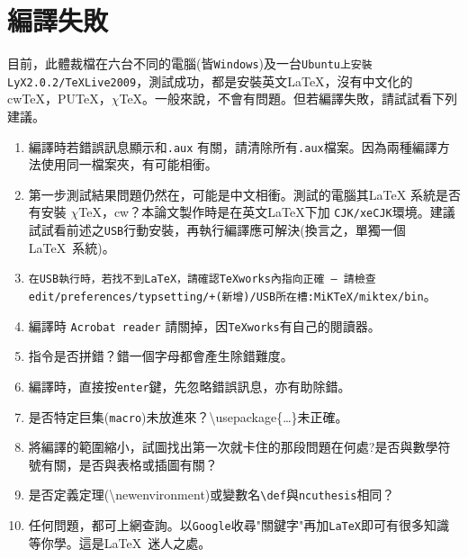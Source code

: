 \section{編譯失敗}
目前，此體裁檔在六台不同的電腦(皆{\tt Windows})及一台{\tt Ubuntu上安裝LyX2.0.2/TeXLive2009}，測試成功，都是安裝英文\LaTeX{}，沒有中文化的cw\TeX，PU\TeX，$\chi$\TeX。一般來說，不會有問題。但若編譯失敗，請試試看下列建議。
\begin{enumerate}
\item 編譯時若錯誤訊息顯示和{\tt .aux} 有關，請清除所有{\tt *.aux}檔案。因為兩種編譯方法使用同一檔案夾，有可能相衝。 
\item 第一步測試結果問題仍然在，可能是中文相衝。測試的電腦其\LaTeX{ }系統是否有安裝 $\chi$\TeX，cw？本論文製作時是在英文\LaTeX{}下加 {\tt CJK/xeCJK}環境。建議試試看前述之{\tt USB}行動安裝，再執行編譯應可解決(換言之，單獨一個\LaTeX\ 系統)。
\item {\color{red}\tt 在USB執行時，若找不到\LaTeX，請確認TeXworks內指向正確 --- 請檢查edit/preferences/typsetting/+(新增)/USB所在槽:MiKTeX/miktex/bin}。
\item {\color{red}編譯時 {\tt Acrobat reader} 請關掉，因{\tt TeXworks}有自己的閱讀器。}
\item 指令是否拼錯？錯一個字母都會產生除錯難度。
\item 編譯時，直接按{\tt enter}鍵，先忽略錯誤訊息，亦有助除錯。
\item 是否特定巨集({\tt macro})未放進來？\textbackslash usepackage\{\ldots\}未正確。
\item 將編譯的範圍縮小，試圖找出第一次就卡住的那段問題在何處?是否與數學符號有關，是否與表格或插圖有關？
\item 是否定義定理(\textbackslash newenvironment)或變數名{\verb|\def|}與{\tt ncuthesis}相同？
\item 任何問題，都可上網查詢。以{\tt Google}收尋"關鍵字"再加{\tt LaTeX}即可有很多知識等你學。這是\LaTeX\ 迷人之處。
\end{enumerate}


